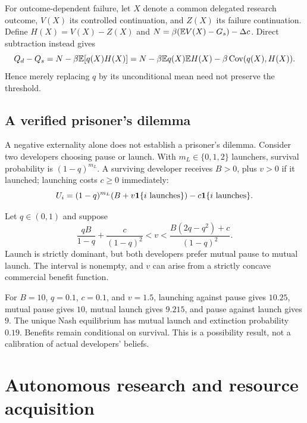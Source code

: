 For outcome-dependent failure, let $X$ denote a common delegated research outcome, $V(X)$ its controlled continuation, and $Z(X)$ its failure continuation. Define $H(X)=V(X)-Z(X)$ and $N=\beta(\mathbb E V(X)-G_s)-\Delta c$. Direct subtraction instead gives
\begin{equation}
 Q_d-Q_s=N-\beta\mathbb E[q(X)H(X)]
 =N-\beta\mathbb E q(X)\mathbb E H(X)-\beta\operatorname{Cov}(q(X),H(X)).
\end{equation}
Hence merely replacing $q$ by its unconditional mean need not preserve the threshold.

\subsection{A verified prisoner's dilemma}
A negative externality alone does not establish a prisoner's dilemma. Consider two developers choosing pause or launch. With $m_L\in\{0,1,2\}$ launchers, survival probability is $(1-q)^{m_L}$. A surviving developer receives $B>0$, plus $v>0$ if it launched; launching costs $c\geq0$ immediately:
\begin{equation}\label{eq:PD}
 U_i=(1-q)^{m_L}(B+v\mathbf 1\{i\text{ launches}\})-c\mathbf 1\{i\text{ launches}\}.
\end{equation}
\begin{proposition}\label{prop:PD}
Let $q\in(0,1)$ and suppose
\begin{equation}\label{eq:PDinterval}
 \frac{qB}{1-q}+\frac{c}{(1-q)^2}<v<\frac{B(2q-q^2)+c}{(1-q)^2}.
\end{equation}
Launch is strictly dominant, but both developers prefer mutual pause to mutual launch. The interval is nonempty, and $v$ can arise from a strictly concave commercial benefit function.
\end{proposition}
For $B=10$, $q=0.1$, $c=0.1$, and $v=1.5$, launching against pause gives $10.25$, mutual pause gives $10$, mutual launch gives $9.215$, and pause against launch gives $9$. The unique Nash equilibrium has mutual launch and extinction probability $0.19$. Benefits remain conditional on survival. This is a possibility result, not a calibration of actual developers' beliefs.

\section{Autonomous research and resource acquisition}\label{sec:autonomy}

